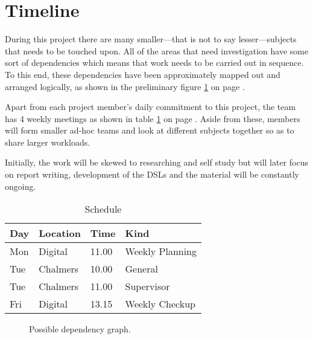 \section{Timeline}
During this project there are many smaller---that is not to say lesser---subjects that needs to be touched upon. All of the areas that need investigation have some sort of dependencies which means that work needs to be carried out in sequence. To this end, these dependencies have been approximately mapped out and arranged logically, as shown in the preliminary figure \ref{fig:dependency_graph} on page \pageref{fig:dependency_graph}.   


Apart from each project member's daily commitment to this project, the team has 4 weekly meetings as shown in table \ref{tab:schedule} on page \pageref{tab:schedule}. Aside from these, members will form smaller ad-hoc teams and look at different subjects together so as to share larger workloads. 

Initially, the work will be skewed to researching and self study but will later focus on report writing, development of the DSLs and the material will be constantly ongoing.


\begin{table}
\caption{Schedule}
\label{tab:schedule}
\centering
\begin{tabular}{llll}
\hline
Day & Location & Time  & Kind            \\ \hline
Mon & Digital  & 11.00 & Weekly Planning \\
Tue & Chalmers & 10.00 & General         \\
Tue & Chalmers & 11.00 & Supervisor      \\
Fri & Digital  & 13.15 & Weekly Checkup 
\end{tabular}
\end{table}


\begin{figure}
  \caption{Possible dependency graph.}
  \label{fig:dependency_graph}
\end{figure}

